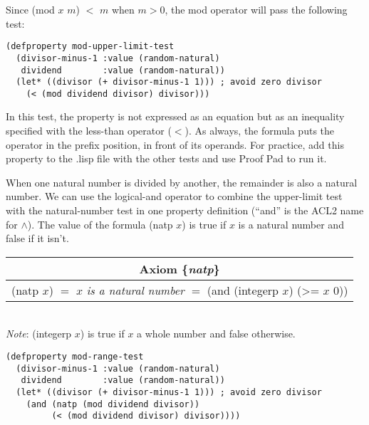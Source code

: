 Since (\textsf{mod} $x$ $m$) $<$ $m$ when $m > 0$,
the \textsf{mod} operator will pass the following test:

\begin{code}
\begin{verbatim}
(defproperty mod-upper-limit-test
  (divisor-minus-1 :value (random-natural)
   dividend        :value (random-natural))
  (let* ((divisor (+ divisor-minus-1 1))) ; avoid zero divisor
    (< (mod dividend divisor) divisor)))
\end{verbatim}
\end{code}

In this test, the property is not expressed as an equation
but as an inequality
specified with the less-than operator ($<$).
As always, the formula puts the operator in the prefix position,
in front of its operands.
For practice, add this property to the .lisp file with the other tests and
use Proof Pad to run it.

When one natural number is divided by another,
the remainder is also a natural number.
We can use the logical-and operator
to combine the upper-limit test with the natural-number test
in one property definition
(``\textsf{and}'' is the ACL2 name for $\wedge$).
\label{natp-op}The value of the formula
\textsf{(natp $x$)} is true
if $x$ is a natural number and false if it isn't.

\label{natp-axiom-formal}
\begin{center}
\begin{tabular}{c}
Axiom \{\emph{natp}\} \\
\hline
(natp $x$) $=$ $x$ \emph{is a natural number} $=$ \textsf{(and (integerp $x$) (>= $x$ 0))}\\
\end{tabular}\\
\emph{Note}: \textsf{(integerp $x$)} is true if $x$ a whole number and false otherwise.
\end{center}

\begin{code}
\begin{verbatim}
(defproperty mod-range-test
  (divisor-minus-1 :value (random-natural)
   dividend        :value (random-natural))
  (let* ((divisor (+ divisor-minus-1 1))) ; avoid zero divisor
    (and (natp (mod dividend divisor))
         (< (mod dividend divisor) divisor))))
\end{verbatim}
\end{code}

